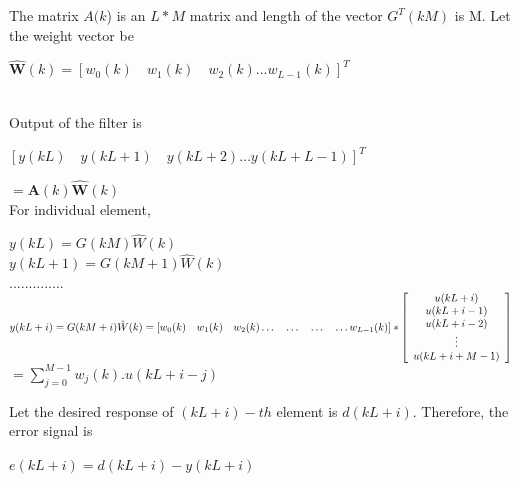 \documentclass[conference]{IEEEtran}
\begin{document}
The matrix $A(k$) is an $L*M$ matrix and length of the vector $G^T(kM)$ is M. Let the weight vector be
\begin{center}
$\hat{\mathbf{W}}(k)=\left[w_{0}(k) \quad w_{1}(k) \quad w_{2}(k) \ldots w_{L-1}(k)\right]^{T}$
\end{center}\\
Output of the filter is 
\begin{center}
$[y(k L) \quad y(k L+1) \quad y(k L+2) \ldots y(k L+L-1)]^{T}$
\end{center}
$ = \mathbf{A}(k) \hat{\mathbf{W}}(k)$ \\
For individual element,
\begin{center}
$y(k L)=G(k M) \hat{W}(k)$ \\ $y(kL+1)=G(k M+1) \hat{W}(k)$ \\ $.............. $ \\ $ y(kL+i)=G(k M+i) \hat{W}(k) \\ =\left[w_{0}(k) \quad w_{1}(k) \quad w_{2}(k) \ldots \quad \ldots \quad \ldots \quad \ldots w_{L-1}(k)\right] * \left[ \begin{array}{c}{u(k L+i)} \\ {u(k L+i-1)} \\ {u(k L+i-2)} \\ {\vdots} \\ {u(k L+i+M-1)}\end{array}\right]$ \\ $=\sum_{j=0}^{M-1} w_{j}(k) . u(k L+i-j)$
\end{center}
Let the desired response of $(kL+i)-th$  element is $d(kL+i)$. Therefore, the error signal is \\
\begin{center}
$e(k L+i)=d(k L+i)-y(k L+i)$
\end{center}
\end{document}
